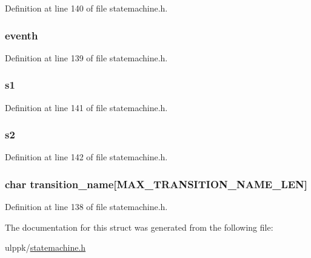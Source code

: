 Definition at line 140 of file statemachine.\-h.

\hypertarget{struct__transition__struct_a59bd332d34b2d67050865ea52c88bc47}{
\subsubsection[{eventh}]{ eventh}}\label{struct__transition__struct_a59bd332d34b2d67050865ea52c88bc47}


Definition at line 139 of file statemachine.\-h.

\hypertarget{struct__transition__struct_a1350baa2c5b7f8e15d952e58a6bab9db}{
\subsubsection[{s1}]{ s1}}\label{struct__transition__struct_a1350baa2c5b7f8e15d952e58a6bab9db}


Definition at line 141 of file statemachine.\-h.

\hypertarget{struct__transition__struct_a297f0deedc2f4794485a7367685a4ade}{
\subsubsection[{s2}]{ s2}}\label{struct__transition__struct_a297f0deedc2f4794485a7367685a4ade}


Definition at line 142 of file statemachine.\-h.

\hypertarget{struct__transition__struct_a63280c8292749ceea0f462abeae944f5}{
\subsubsection[{transition\-\_\-name}]{\setlength{\rightskip}{0pt plus 5cm}char transition\-\_\-name\mbox{[}{\bf M\-A\-X\-\_\-\-T\-R\-A\-N\-S\-I\-T\-I\-O\-N\-\_\-\-N\-A\-M\-E\-\_\-\-L\-E\-N}\mbox{]}}}\label{struct__transition__struct_a63280c8292749ceea0f462abeae944f5}


Definition at line 138 of file statemachine.\-h.



The documentation for this struct was generated from the following file\-:\begin{DoxyCompactItemize}
\item 
ulppk/\hyperlink{statemachine_8h}{statemachine.\-h}\end{DoxyCompactItemize}
